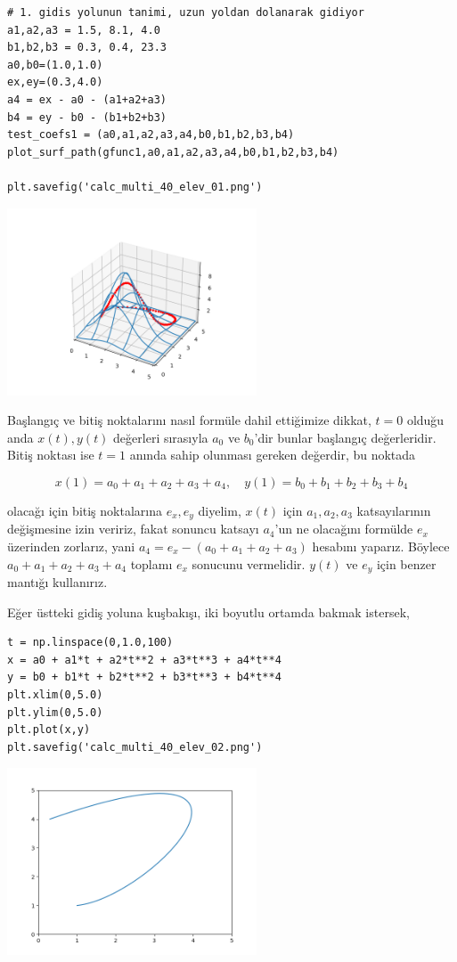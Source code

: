 \documentclass[12pt,fleqn]{article}\usepackage{../../common}
\begin{document}
\begin{verbatim}
# 1. gidis yolunun tanimi, uzun yoldan dolanarak gidiyor
a1,a2,a3 = 1.5, 8.1, 4.0
b1,b2,b3 = 0.3, 0.4, 23.3
a0,b0=(1.0,1.0)
ex,ey=(0.3,4.0)
a4 = ex - a0 - (a1+a2+a3)
b4 = ey - b0 - (b1+b2+b3)
test_coefs1 = (a0,a1,a2,a3,a4,b0,b1,b2,b3,b4)
plot_surf_path(gfunc1,a0,a1,a2,a3,a4,b0,b1,b2,b3,b4)

plt.savefig('calc_multi_40_elev_01.png')
\end{verbatim}

\includegraphics[width=20em]{calc_multi_40_elev_01.png}

Başlangıç ve bitiş noktalarını nasıl formüle dahil ettiğimize dikkat, $t=0$
olduğu anda $x(t),y(t)$ değerleri sırasıyla $a_0$ ve $b_0$'dir bunlar başlangıç
değerleridir. Bitiş noktası ise $t=1$ anında sahip olunması gereken değerdir,
bu noktada

$$
x(1) = a_0 + a_1 + a_2 + a_3 + a_4 ,\quad
y(1) = b_0 + b_1 + b_2 + b_3 + b_4 
$$

olacağı için bitiş noktalarına $e_x,e_y$ diyelim, $x(t)$ için $a_1,a_2,a_3$
katsayılarının değişmesine izin veririz, fakat sonuncu katsayı $a_4$'un ne
olacağını formülde $e_x$ üzerinden zorlarız, yani $a_4 = e_x - (a_0 + a_1 + a_2
+ a_3)$ hesabını yaparız. Böylece $a_0 + a_1 + a_2 + a_3 + a_4$ toplamı
$e_x$ sonucunu vermelidir. $y(t)$ ve $e_y$ için benzer mantığı kullanırız.

Eğer üstteki gidiş yoluna kuşbakışı, iki boyutlu ortamda bakmak istersek,

\begin{verbatim}
t = np.linspace(0,1.0,100)
x = a0 + a1*t + a2*t**2 + a3*t**3 + a4*t**4 
y = b0 + b1*t + b2*t**2 + b3*t**3 + b4*t**4
plt.xlim(0,5.0)
plt.ylim(0,5.0)
plt.plot(x,y)
plt.savefig('calc_multi_40_elev_02.png')
\end{verbatim}

\includegraphics[width=20em]{calc_multi_40_elev_02.png}
\end{document}
